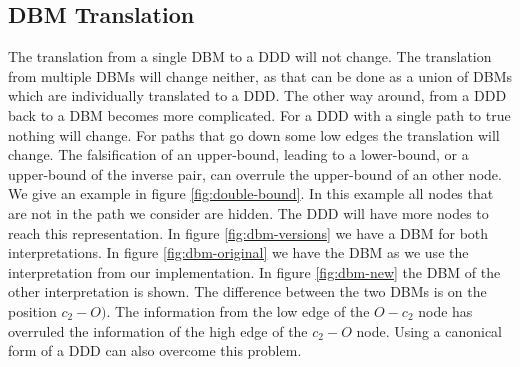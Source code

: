 \subsection{DBM Translation}
The translation from a single DBM to a DDD will not change. The translation from multiple DBMs will change neither, as that can be done as a union of DBMs which are individually translated to a DDD. The other way around, from a DDD back to a DBM becomes more complicated. For a DDD with a single path to true nothing will change. For paths that go down some low edges the translation will change. The falsification of an upper-bound, leading to a lower-bound, or a upper-bound of the inverse pair, can overrule the upper-bound of an other node. We give an example in figure \ref{fig:double-bound}. In this example all nodes that are not in the path we consider are hidden. The DDD will have more nodes to reach this representation. In figure \ref{fig:dbm-versions} we have a DBM for both interpretations. In figure \ref{fig:dbm-original} we have the DBM as we use the interpretation from our implementation. In figure \ref{fig:dbm-new} the DBM of the other interpretation is shown. The difference between the two DBMs is on the position $c_2 - O)$. The information from the low edge of the $O - c_2$ node has overruled the information of the high edge of the $c_2 - O$ node. Using a canonical form of a DDD can also overcome this problem.

